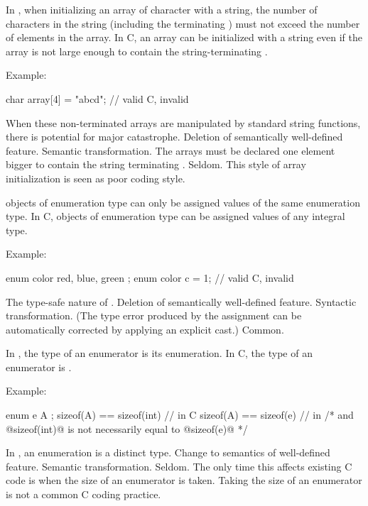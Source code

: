 \change
In \Cpp{}, when initializing an array of character with a string, the number of
characters in the string (including the terminating ) must not exceed the
number of elements in the array. In C, an array can be initialized with a string even if
the array is not large enough to contain the string-terminating .

Example:
\begin{codeblock}
char array[4] = "abcd";         // valid C, invalid \Cpp{}
\end{codeblock}
\rationale
When these non-terminated arrays are manipulated by standard
string functions, there is potential for major catastrophe.
\effect
Deletion of semantically well-defined feature.
\difficulty
Semantic transformation.
The arrays must be declared one element bigger to contain the
string terminating .
\howwide
Seldom.
This style of array initialization is seen as poor coding style.

\change
\Cpp{} objects of enumeration type can only be assigned values of the same enumeration type.
In C, objects of enumeration type can be assigned values of any integral type.

Example:
\begin{codeblock}
enum color { red, blue, green };
enum color c = 1;               // valid C, invalid \Cpp{}
\end{codeblock}

\rationale
The type-safe nature of \Cpp{}.
\effect
Deletion of semantically well-defined feature.
\difficulty
Syntactic transformation.
(The type error produced by the assignment can be automatically
corrected by applying an explicit cast.)
\howwide
Common.

\change
In \Cpp{}, the type of an enumerator is its enumeration. In C, the type of an enumerator is .

Example:
\begin{codeblock}
enum e { A };
sizeof(A) == sizeof(int)        // in C
sizeof(A) == sizeof(e)          // in \Cpp{}
/* and @sizeof(int)@ is not necessarily equal to @sizeof(e)@ */
\end{codeblock}

\rationale
In \Cpp{}, an enumeration is a distinct type.
\effect
Change to semantics of well-defined feature.
\difficulty
Semantic transformation.
\howwide
Seldom.
The only time this affects existing C code is when the size of an
enumerator is taken.
Taking the size of an enumerator is not a
common C coding practice.


